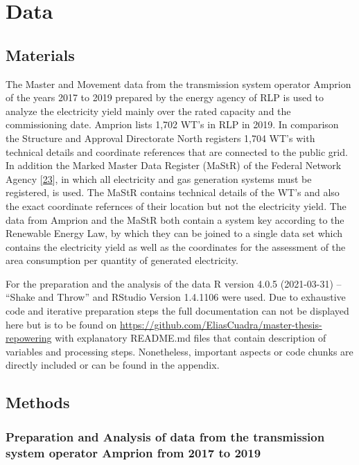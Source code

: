 \documentclass[a4paper,11pt]{article}
\begin{document}
\hypertarget{data}{%
\section{Data}\label{data}}

\hypertarget{materials}{%
\subsection{Materials}\label{materials}}

The Master and Movement data from the transmission system operator Amprion of the years 2017 to 2019 prepared by the energy agency of RLP is used to analyze the electricity yield mainly over the rated capacity and the commissioning date. Amprion lists 1,702 WT's in RLP in 2019. In comparison the Structure and Approval Directorate North registers 1,704 WT's with technical details and coordinate references that are connected to the public grid. In addition the Marked Master Data Register (MaStR) of the Federal Network Agency {[}\protect\hyperlink{ref-Marktstammdatenregister.2020}{23}{]}, in which all electricity and gas generation systems must be registered, is used. The MaStR contains technical details of the WT's and also the exact coordinate refernces of their location but not the electricity yield. The data from Amprion and the MaStR both contain a system key according to the Renewable Energy Law, by which they can be joined to a single data set which contains the electricity yield as well as the coordinates for the assessment of the area consumption per quantity of generated electricity.

For the preparation and the analysis of the data R version 4.0.5 (2021-03-31) -- ``Shake and Throw'' and RStudio Version 1.4.1106 were used. Due to exhaustive code and iterative preparation steps the full documentation can not be displayed here but is to be found on \url{https://github.com/EliasCuadra/master-thesis-repowering} with explanatory README.md files that contain description of variables and processing steps. Nonetheless, important aspects or code chunks are directly included or can be found in the appendix.

\hypertarget{methods}{%
\subsection{Methods}\label{methods}}

\hypertarget{preparation-and-analysis-of-data-from-the-transmission-system-operator-amprion-from-2017-to-2019}{%
\subsubsection{Preparation and Analysis of data from the transmission system operator Amprion from 2017 to 2019}\label{preparation-and-analysis-of-data-from-the-transmission-system-operator-amprion-from-2017-to-2019}}
\end{document}
